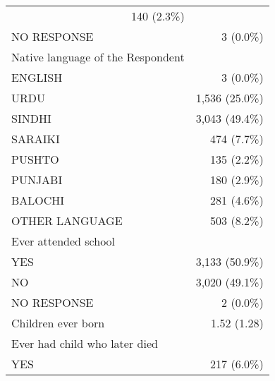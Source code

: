 \documentclass{article}
\begin{document}
\begin{table}[!h]
\begin{tabular}{ll}
  \multicolumn{1}{r}{140 (2.3\%)} \\
\multicolumn{1}{l}{\hspace{1em}NO RESPONSE} &
  \multicolumn{1}{r}{3 (0.0\%)} \\
\multicolumn{1}{l}{Native language of the Respondent} &
  \multicolumn{1}{r}{} \\
\multicolumn{1}{l}{\hspace{1em}ENGLISH} &
  \multicolumn{1}{r}{3 (0.0\%)} \\
\multicolumn{1}{l}{\hspace{1em}URDU} &
  \multicolumn{1}{r}{1,536 (25.0\%)} \\
\multicolumn{1}{l}{\hspace{1em}SINDHI} &
  \multicolumn{1}{r}{3,043 (49.4\%)} \\
\multicolumn{1}{l}{\hspace{1em}SARAIKI} &
  \multicolumn{1}{r}{474 (7.7\%)} \\
\multicolumn{1}{l}{\hspace{1em}PUSHTO} &
  \multicolumn{1}{r}{135 (2.2\%)} \\
\multicolumn{1}{l}{\hspace{1em}PUNJABI} &
  \multicolumn{1}{r}{180 (2.9\%)} \\
\multicolumn{1}{l}{\hspace{1em}BALOCHI} &
  \multicolumn{1}{r}{281 (4.6\%)} \\
\multicolumn{1}{l}{\hspace{1em}OTHER LANGUAGE} &
  \multicolumn{1}{r}{503 (8.2\%)} \\
\multicolumn{1}{l}{Ever attended school} &
  \multicolumn{1}{r}{} \\
\multicolumn{1}{l}{\hspace{1em}YES} &
  \multicolumn{1}{r}{3,133 (50.9\%)} \\
\multicolumn{1}{l}{\hspace{1em}NO} &
  \multicolumn{1}{r}{3,020 (49.1\%)} \\
\multicolumn{1}{l}{\hspace{1em}NO RESPONSE} &
  \multicolumn{1}{r}{2 (0.0\%)} \\
\multicolumn{1}{l}{Children ever born} &
  \multicolumn{1}{r}{1.52 (1.28)} \\
\multicolumn{1}{l}{Ever had child who later died} &
  \multicolumn{1}{r}{} \\
\multicolumn{1}{l}{\hspace{1em}YES} &
  \multicolumn{1}{r}{217 (6.0\%)} \\

\end{tabular}
\end{table}
\end{document}
